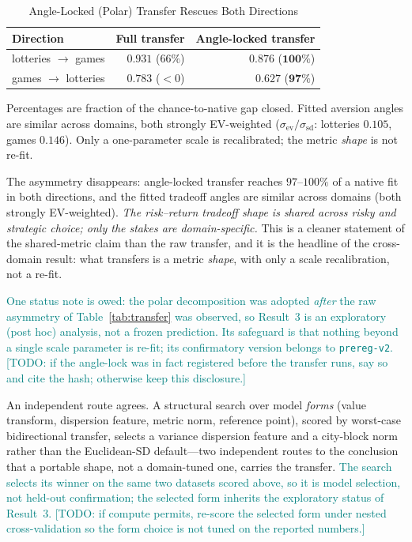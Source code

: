 \documentclass[journal]{IEEEtran}
\newcommand{\rev}[1]{\textcolor{teal}{#1}}
\begin{document}
\begin{table}[!t]
\renewcommand{\arraystretch}{1.15}
\caption{Angle-Locked (Polar) Transfer Rescues Both Directions}
\label{tab:polar}
\centering
\begin{tabular}{l r r}
\toprule
\textbf{Direction} & \textbf{Full transfer} & \textbf{Angle-locked transfer} \\
\midrule
lotteries $\to$ games & $0.931$ \; ($66\%$) & $\mathbf{0.876}$ \; ($\mathbf{100\%}$) \\
games $\to$ lotteries & $0.783$ \; ($<0$)   & $\mathbf{0.627}$ \; ($\mathbf{97\%}$) \\
\bottomrule
\end{tabular}
\begin{flushleft}
\footnotesize{Percentages are fraction of the chance-to-native gap closed. Fitted aversion angles are similar across domains, both strongly EV-weighted ($\sigma_{\mathrm{ev}}/\sigma_{\mathrm{sd}}$: lotteries $0.105$, games $0.146$). Only a one-parameter scale is recalibrated; the metric \emph{shape} is not re-fit.}
\end{flushleft}
\end{table}

The asymmetry disappears: angle-locked transfer reaches $97$--$100\%$ of a native fit in both directions, and the fitted tradeoff angles are similar across domains (both strongly EV-weighted).
\emph{The risk--return tradeoff shape is shared across risky and strategic choice; only the stakes are domain-specific.}
This is a cleaner statement of the shared-metric claim than the raw transfer, and it is the headline of the cross-domain result: what transfers is a metric \emph{shape}, with only a scale recalibration, not a re-fit.

\rev{One status note is owed: the polar decomposition was adopted \emph{after} the raw asymmetry of Table~\ref{tab:transfer} was observed, so Result~3 is an exploratory (post hoc) analysis, not a frozen prediction. Its safeguard is that nothing beyond a single scale parameter is re-fit; its confirmatory version belongs to \texttt{prereg-v2}. [TODO: if the angle-lock was in fact registered before the transfer runs, say so and cite the hash; otherwise keep this disclosure.]}

An independent route agrees.
A structural search over model \emph{forms} (value transform, dispersion feature, metric norm, reference point), scored by worst-case bidirectional transfer, selects a variance dispersion feature and a city-block norm rather than the Euclidean-SD default---two independent routes to the conclusion that a portable shape, not a domain-tuned one, carries the transfer.
\rev{The search selects its winner on the same two datasets scored above, so it is model selection, not held-out confirmation; the selected form inherits the exploratory status of Result~3. [TODO: if compute permits, re-score the selected form under nested cross-validation so the form choice is not tuned on the reported numbers.]}
\end{document}
